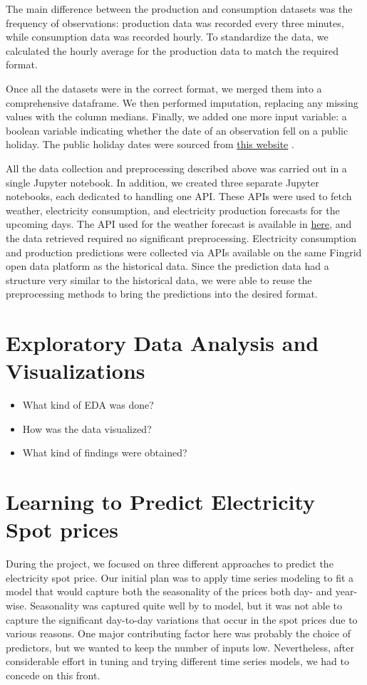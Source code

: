 \documentclass{article}
\numberwithin{equation}{section}
\begin{document}
\begin{itemize}
The main difference between the production and consumption datasets was the frequency of observations: production data was recorded every three minutes, while consumption data was recorded hourly. To standardize the data, we calculated the hourly average for the production data to match the required format.

Once all the datasets were in the correct format, we merged them into a comprehensive dataframe. We then performed imputation, replacing any missing values with the column medians. Finally, we added one more input variable: a boolean variable indicating whether the date of an observation fell on a public holiday. The public holiday dates were sourced from \href{https://www.officeholidays.com/countries/finland/2021}{this website} .

All the data collection and preprocessing described above was carried out in a single Jupyter notebook. In addition, we created three separate Jupyter notebooks, each dedicated to handling one API. These APIs were used to fetch weather, electricity consumption, and electricity production forecasts for the upcoming days. The API used for the weather forecast is available in \href{https://api.open-meteo.com/v1/forecast}{here}, and the data retrieved required no significant preprocessing. Electricity consumption and production predictions were collected via APIs available on the same Fingrid open data platform as the historical data. Since the prediction data had a structure very similar to the historical data, we were able to reuse the preprocessing methods to bring the predictions into the desired format.
\end{itemize}

\section{Exploratory Data Analysis and Visualizations}
\begin{itemize}
	\item What kind of EDA was done?
	\item How was the data visualized?
	\item What kind of findings were obtained?
\end{itemize}

\section{Learning to Predict Electricity Spot prices}
During the project, we focused on three different approaches to predict the electricity spot price. Our initial plan was to apply time series modeling to fit a model that would capture both the seasonality of the prices both day- and year-wise. Seasonality was captured quite well by to model, but it was not able to capture the significant day-to-day variations that occur in the spot prices due to various reasons. One major contributing factor here was probably the choice of predictors, but we wanted to keep the number of inputs low. Nevertheless, after considerable effort in tuning and trying different time series models, we had to concede on this front.
\end{document}
